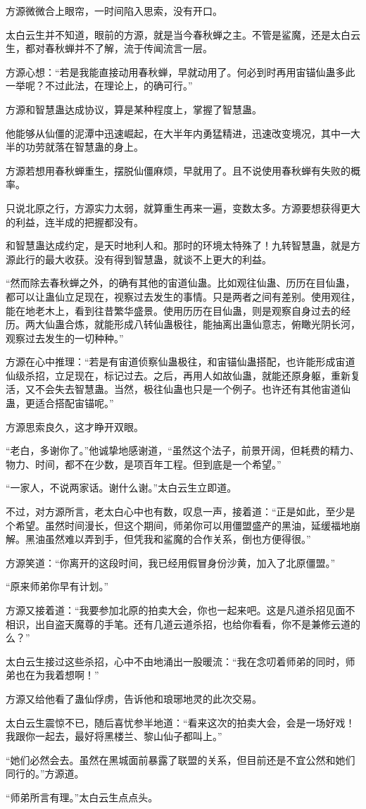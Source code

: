 \begin{this_body}
方源微微合上眼帘，一时间陷入思索，没有开口。

太白云生并不知道，眼前的方源，就是当今春秋蝉之主。不管是鲨魔，还是太白云生，都对春秋蝉并不了解，流于传闻流言一层。

方源心想：“若是我能直接动用春秋蝉，早就动用了。何必到时再用宙锚仙蛊多此一举呢？不过此法，在理论上，的确可行。”

方源和智慧蛊达成协议，算是某种程度上，掌握了智慧蛊。

他能够从仙僵的泥潭中迅速崛起，在大半年内勇猛精进，迅速改变境况，其中一大半的功劳就落在智慧蛊的身上。

方源若想用春秋蝉重生，摆脱仙僵麻烦，早就用了。且不说使用春秋蝉有失败的概率。

只说北原之行，方源实力太弱，就算重生再来一遍，变数太多。方源要想获得更大的利益，连半成的把握都没有。

和智慧蛊达成约定，是天时地利人和。那时的环境太特殊了！九转智慧蛊，就是方源此行的最大收获。没有得到智慧蛊，就谈不上更大的利益。

“然而除去春秋蝉之外，的确有其他的宙道仙蛊。比如观往仙蛊、历历在目仙蛊，都可以让蛊仙立足现在，视察过去发生的事情。只是两者之间有差别。使用观往，能在地老木上，看到往昔繁华盛景。使用历历在目仙蛊，则是观察自身过去的经历。两大仙蛊合炼，就能形成八转仙蛊极往，能抽离出蛊仙意志，俯瞰光阴长河，观察过去发生的一切种种。”

方源在心中推理：“若是有宙道侦察仙蛊极往，和宙锚仙蛊搭配，也许能形成宙道仙级杀招，立足现在，标记过去。之后，再用人如故仙蛊，就能还原身躯，重新复活，又不会失去智慧蛊。当然，极往仙蛊也只是一个例子。也许还有其他宙道仙蛊，更适合搭配宙锚呢。”

方源思索良久，这才睁开双眼。

“老白，多谢你了。”他诚挚地感谢道，“虽然这个法子，前景开阔，但耗费的精力、物力、时间，都不在少数，是项百年工程。但到底是一个希望。”

“一家人，不说两家话。谢什么谢。”太白云生立即道。

不过，对方源所言，老太白心中也有数，叹息一声，接着道：“正是如此，至少是个希望。虽然时间漫长，但这个期间，师弟你可以用僵盟盛产的黑油，延缓福地崩解。黑油虽然难以弄到手，但凭我和鲨魔的合作关系，倒也方便得很。”

方源笑道：“你离开的这段时间，我已经用假冒身份沙黄，加入了北原僵盟。”

“原来师弟你早有计划。”

方源又接着道：“我要参加北原的拍卖大会，你也一起来吧。这是凡道杀招见面不相识，出自盗天魔尊的手笔。还有几道云道杀招，也给你看看，你不是兼修云道的么？”

太白云生接过这些杀招，心中不由地涌出一股暖流：“我在念叨着师弟的同时，师弟也在为我着想啊！”

方源又给他看了蛊仙俘虏，告诉他和琅琊地灵的此次交易。

太白云生震惊不已，随后喜忧参半地道：“看来这次的拍卖大会，会是一场好戏！我跟你一起去，最好将黑楼兰、黎山仙子都叫上。”

“她们必然会去。虽然在黑城面前暴露了联盟的关系，但目前还是不宜公然和她们同行的。”方源道。

“师弟所言有理。”太白云生点点头。

\end{this_body}

